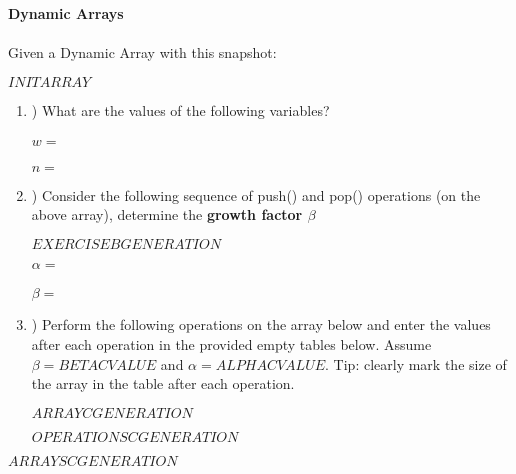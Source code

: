 \textbf{\LARGE{\color{tumgadPurple} Dynamic Arrays}}\\
\\
\noindent
Given a Dynamic Array with this snapshot:
\begin{center}
    $INITARRAY$
\end{center}
\begin{enumerate}[label=\alph*]
    \item \hspace{-5px}) What are the values of the following variables?\\
    \\
    $w = $\\
    \\
    $n = $
    \\
    \item \hspace{-5px}) Consider the following sequence of push() and pop() operations (on the above array), determine the \textbf{growth factor $\beta$}
    \begin{center}
        $EXERCISEBGENERATION$
    \end{center}
    $\alpha = $\\
    \\
    $\beta = $\\
    \item \hspace{-5px}) Perform the following operations on the array below and enter the values after each operation in the provided empty
    tables below. Assume $\beta = BETACVALUE$ and $\alpha = ALPHACVALUE$. Tip: clearly mark the size of the array in the table after each operation.
    \begin{center}
        $ARRAYCGENERATION$
    \end{center}
    $OPERATIONSCGENERATION$
\end{enumerate}
\begin{center}
    $ARRAYSCGENERATION$
\end{center}
